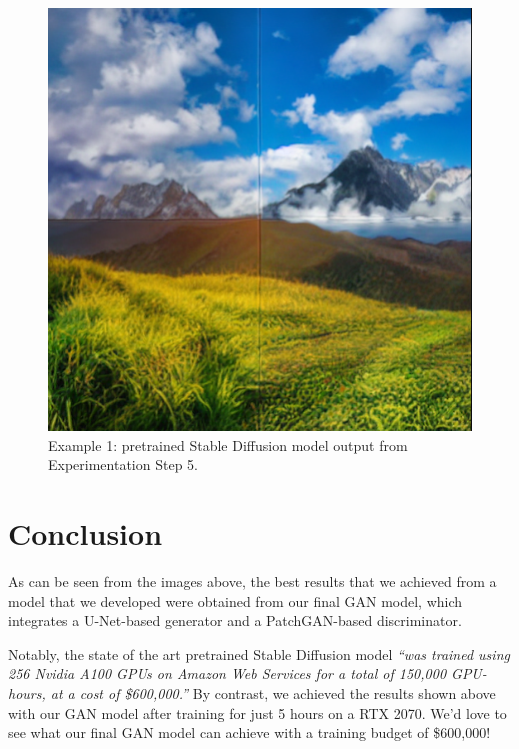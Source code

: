 \documentclass[sigconf]{acmart}
\begin{document}
\begin{figure}[h!]
    \centering
    \includegraphics[width=\linewidth]{stable_diffusion_step_5}
    \caption{Example 1: pretrained Stable Diffusion model output from Experimentation Step 5.}
    \label{fig:stable_diffusion_step_5}
\end{figure}

\section*{Conclusion}

As can be seen from the images above, the best results that we achieved from a model that we developed were obtained from our final GAN model, which integrates a U-Net-based generator and a PatchGAN-based discriminator.

Notably, the state of the art pretrained Stable Diffusion model \textit{“was trained using 256 Nvidia A100 GPUs on Amazon Web Services for a total of 150,000 GPU-hours, at a cost of \$600,000.”} By contrast, we achieved the results shown above with our GAN model after training for just 5 hours on a RTX 2070. We’d love to see what our final GAN model can achieve with a training budget of \$600,000!
\end{document}
